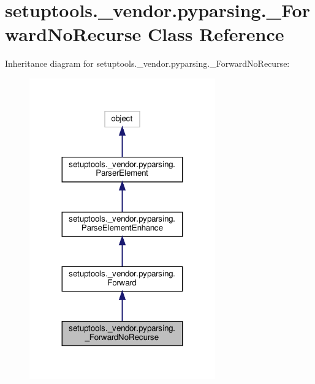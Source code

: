\hypertarget{classsetuptools_1_1__vendor_1_1pyparsing_1_1__ForwardNoRecurse}{}\section{setuptools.\+\_\+vendor.\+pyparsing.\+\_\+\+Forward\+No\+Recurse Class Reference}
\label{classsetuptools_1_1__vendor_1_1pyparsing_1_1__ForwardNoRecurse}


Inheritance diagram for setuptools.\+\_\+vendor.\+pyparsing.\+\_\+\+Forward\+No\+Recurse\+:
\nopagebreak
\begin{figure}[H]
\begin{center}
\leavevmode
\includegraphics[width=227pt]{classsetuptools_1_1__vendor_1_1pyparsing_1_1__ForwardNoRecurse__inherit__graph}
\end{center}
\end{figure}


